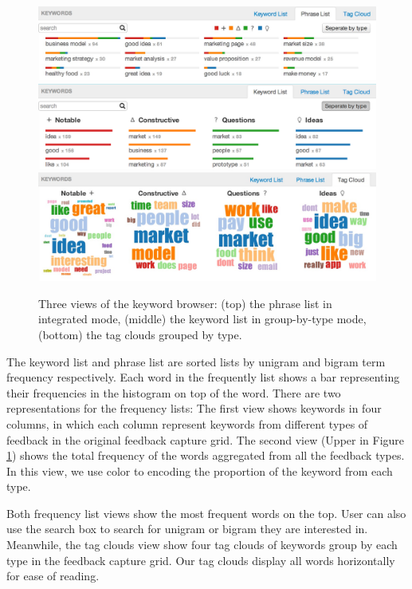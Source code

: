 \documentclass{sigchi}
\begin{document}
\begin{figure}[]
\centering
\includegraphics[width=1.4\columnwidth]{images/phrase-list}
\includegraphics[width=1.4\columnwidth]{images/keyword-list}
\includegraphics[width=1.4\columnwidth]{images/clouds}
\caption{Three views of the keyword browser:
(top) the phrase list in integrated mode,
(middle) the keyword list in group-by-type mode,
(bottom) the tag clouds grouped by type.}
\label{fig:keyword-lists}
\end{figure}

The keyword list and phrase list are sorted lists by unigram and bigram term
frequency respectively.  Each word in the frequently list shows a bar
representing their frequencies in the histogram on top of the word.  There are
two representations for the frequency lists: The first view shows keywords in
four columns, in which each column represent keywords from different types of
feedback in the original feedback capture grid. The second view (Upper in
Figure \ref{fig:keyword-lists}) shows the total frequency of the words
aggregated from all the feedback types.  In this view, we use color to
encoding the proportion of the keyword from each type.

Both frequency list views show the most frequent words on the top.  User can
also use the search box to search for unigram or bigram they are interested in.
Meanwhile, the tag clouds view show four tag clouds of keywords group by each
type in the feedback capture grid.  Our tag clouds display all words
horizontally for ease of reading.
\end{document}
